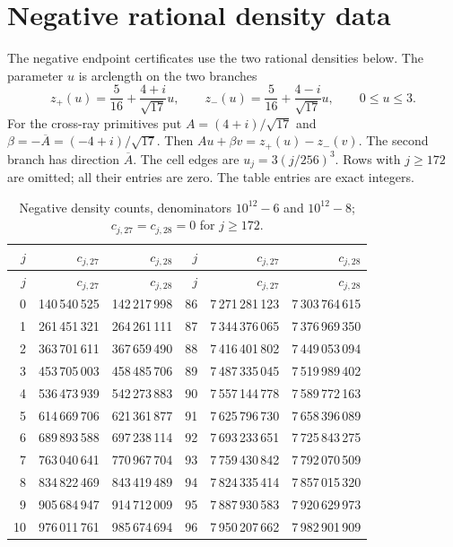 \section{Negative rational density data}
\label{app:negative-data}
The negative endpoint certificates use the two rational densities below.
The parameter $u$ is arclength on the two branches
\[
 z_+(u)=\frac5{16}+\frac{4+i}{\sqrt{17}}u,\qquad
 z_-(u)=\frac5{16}+\frac{4-i}{\sqrt{17}}u,\qquad 0\le u\le3.
\]
For the cross-ray primitives put
$A=(4+i)/\sqrt{17}$ and $\beta=-\overline A=(-4+i)/\sqrt{17}$. Then
$Au+\beta v=z_+(u)-z_-(v)$. The second branch has direction $\overline A$.
The cell edges are
$u_j=3(j/256)^3$. Rows with $j\ge172$ are omitted; all their entries are zero.
The table entries are exact integers.
\small
\begin{longtable}{@{}r r r@{\qquad\qquad}r r r@{}}
\caption{Negative density counts, denominators $10^{12}-6$ and $10^{12}-8$; $c_{j,27}=c_{j,28}=0$ for $j\ge172$.}\label{tab:negative-density}\\
\toprule $j$ & $c_{j,27}$ & $c_{j,28}$ & $j$ & $c_{j,27}$ & $c_{j,28}$\\ \midrule
\endfirsthead
\toprule $j$ & $c_{j,27}$ & $c_{j,28}$ & $j$ & $c_{j,27}$ & $c_{j,28}$\\ \midrule
\endhead
0 & 140\,540\,525 & 142\,217\,998 & 86 & 7\,271\,281\,123 & 7\,303\,764\,615\\
1 & 261\,451\,321 & 264\,261\,111 & 87 & 7\,344\,376\,065 & 7\,376\,969\,350\\
2 & 363\,701\,611 & 367\,659\,490 & 88 & 7\,416\,401\,802 & 7\,449\,053\,094\\
3 & 453\,705\,003 & 458\,485\,706 & 89 & 7\,487\,335\,045 & 7\,519\,989\,402\\
4 & 536\,473\,939 & 542\,273\,883 & 90 & 7\,557\,144\,778 & 7\,589\,772\,163\\
5 & 614\,669\,706 & 621\,361\,877 & 91 & 7\,625\,796\,730 & 7\,658\,396\,089\\
6 & 689\,893\,588 & 697\,238\,114 & 92 & 7\,693\,233\,651 & 7\,725\,843\,275\\
7 & 763\,040\,641 & 770\,967\,704 & 93 & 7\,759\,430\,842 & 7\,792\,070\,509\\
8 & 834\,822\,469 & 843\,419\,489 & 94 & 7\,824\,335\,414 & 7\,857\,015\,320\\
9 & 905\,684\,947 & 914\,712\,009 & 95 & 7\,887\,930\,583 & 7\,920\,629\,973\\
10 & 976\,011\,761 & 985\,674\,694 & 96 & 7\,950\,207\,662 & 7\,982\,901\,909\\

\end{longtable}
